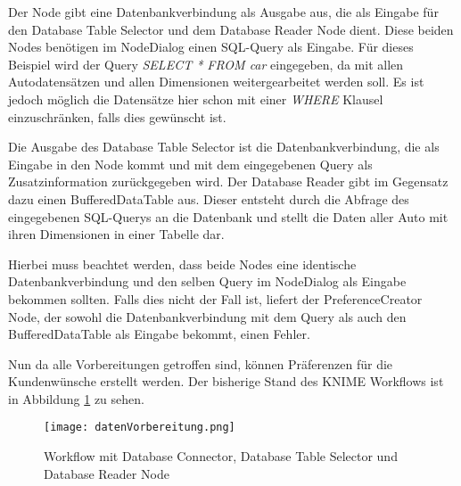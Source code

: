 Der Node gibt eine Datenbankverbindung als Ausgabe aus, die als Eingabe für den Database Table Selector und dem Database Reader Node dient. Diese beiden Nodes benötigen im NodeDialog einen SQL-Query als Eingabe. Für dieses Beispiel wird der Query \textit{SELECT * FROM car} eingegeben, da mit allen Autodatensätzen und allen Dimensionen weitergearbeitet werden soll. Es ist jedoch möglich die Datensätze hier schon mit einer \textit{WHERE} Klausel einzuschränken, falls dies gewünscht ist.

Die Ausgabe des Database Table Selector ist die Datenbankverbindung, die als Eingabe in den Node kommt und mit dem eingegebenen Query als Zusatzinformation zurückgegeben wird. Der Database Reader gibt im Gegensatz dazu einen BufferedDataTable aus. Dieser entsteht durch die Abfrage des eingegebenen SQL-Querys an die Datenbank und stellt die Daten aller Auto mit ihren Dimensionen in einer Tabelle dar. 

Hierbei muss beachtet werden, dass beide Nodes eine identische Datenbankverbindung und den selben Query im NodeDialog als Eingabe bekommen sollten. Falls dies nicht der Fall ist, liefert der PreferenceCreator Node, der sowohl die Datenbankverbindung mit dem Query als auch den BufferedDataTable als Eingabe bekommt, einen Fehler.

Nun da alle Vorbereitungen getroffen sind, können Präferenzen für die Kundenwünsche erstellt werden. Der bisherige Stand des KNIME Workflows ist in Abbildung \ref{img:datenVorbereitung} zu sehen.

\begin{figure}[H]
	\centering
	\texttt{[image: datenVorbereitung.png]}
	\caption{Workflow mit Database Connector, Database Table Selector und Database Reader Node}
	\label{img:datenVorbereitung}
\end{figure} 
